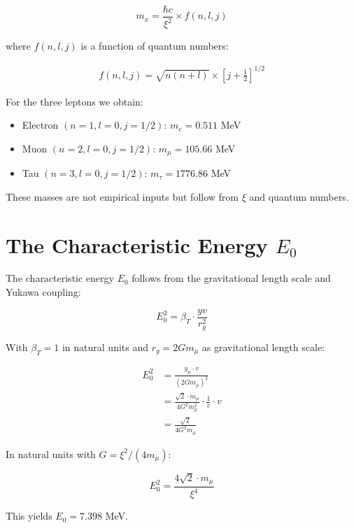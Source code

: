 \documentclass[12pt,a4paper]{article}
\begin{document}
	\begin{equation}
		m_x = \frac{\hbar c}{\xi^2} \times f(n, l, j)
	\end{equation}
	
	where $f(n, l, j)$ is a function of quantum numbers:
	
	\begin{align}
		f(n, l, j) = \sqrt{n(n+l)} \times \left[j + \frac{1}{2}\right]^{1/2}
	\end{align}
	
	For the three leptons we obtain:
	
	\begin{itemize}
		\item Electron $(n=1, l=0, j=1/2)$: $m_e = 0.511$ MeV
		\item Muon $(n=2, l=0, j=1/2)$: $m_\mu = 105.66$ MeV
		\item Tau $(n=3, l=0, j=1/2)$: $m_\tau = 1776.86$ MeV
	\end{itemize}
	
	These masses are not empirical inputs but follow from $\xi$ and quantum numbers.
	
	\section{The Characteristic Energy $E_0$}
	
	The characteristic energy $E_0$ follows from the gravitational length scale and Yukawa coupling:
	
	\begin{equation}
		E_0^2 = \beta_T \cdot \frac{yv}{r_g^2}
	\end{equation}
	
	With $\beta_T = 1$ in natural units and $r_g = 2Gm_\mu$ as gravitational length scale:
	
	\begin{align}
		E_0^2 &= \frac{y_\mu \cdot v}{(2Gm_\mu)^2}\\
		&= \frac{\sqrt{2} \cdot m_\mu}{4G^2 m_\mu^2} \cdot \frac{1}{v} \cdot v\\
		&= \frac{\sqrt{2}}{4G^2 m_\mu}
	\end{align}
	
	In natural units with $G = \xi^2/(4m_\mu)$:
	
	\begin{equation}
		E_0^2 = \frac{4\sqrt{2} \cdot m_\mu}{\xi^4}
	\end{equation}
	
	This yields $E_0 = 7.398$ MeV.
	
\end{document}
